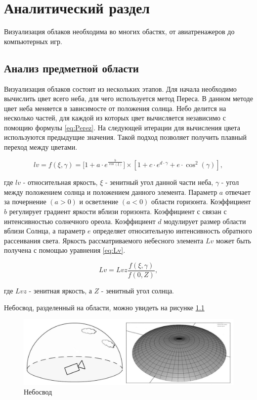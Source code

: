 \chapter{Аналитический раздел}
\label{cha:analysis}

Визуализация облаков необходима во многих обастях, от авиатренажеров до компьютерных игр.

\section{Анализ предметной области}

Визуализация облаков состоит из нескольких этапов. Для начала необходимо вычислить цвет всего неба,
для чего используется метод Переса. В данном методе цвет неба меняется в зависимосте от положения
солнца. Небо делится на несколько частей, для каждой из которых цвет вычисляется независимо
с помощию формулы \ref{eq:Perez}. На следующей итерации для вычисления цвета используются предыдущие
значения. Такой подход позволяет получить плавный переход между цветами.

\begin{equation}\label{eq:Perez}
    lv = f(\xi, \gamma) = \bigg[ 1 + a \cdot e^{\frac{b}{\cos(\xi)}} \bigg]
    \times [1 + c \cdot e^{d \cdot \gamma} + e \cdot \cos^2(\gamma)],
\end{equation}

где $lv$ - относительная яркость, $\xi$ - зенитный угол данной части неба, $\gamma$ - угол между
положением солнца и положением данного элемента.
Параметр $a$ отвечает за почернение $(a > 0)$ и осветление $(a < 0)$ области горизонта.
Коэффициент $b$ регулирует градиент яркости вблизи горизонта. Коэффициент $с$ связан с
интенсивностью солнечного ореола. Коэффициент $d$ модулирует размер области вблизи Солнца,
а параметр $e$ определяет относительную интенсивность обратного рассеивания света. Яркость
рассматриваемого небесного элемента $Lv$ может быть получена с помощью уравнения \ref{eq:Lv}.

\begin{equation}\label{eq:Lv}
    Lv = Lvz \frac{f(\xi, \gamma)}{f(0, Z)},
\end{equation}

где $Lvz$ - зенитная яркость, а $Z$ - зенитный угол солнца.

Небосвод, разделенный на области, можно увидеть на рисунке \ref{img:skydome}

\begin{figure}[H]
    \includegraphics[scale=0.35]{img/skydome.png}
    \caption{Небосвод}
    \label{img:skydome}
\end{figure}

